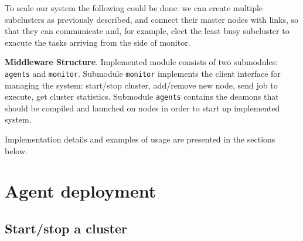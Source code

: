 \documentclass[12pt]{article}
\newcommand\MyFive[2]{%
  \foreach \x in {1,...,5}{
    \pgfmathparse{(\x-1)*72+floor(\x/6)*36 + 90 - 90*#2}
    \node[draw,circle,inner sep=5pt,text width=1cm, align=center] (#1-\x) at (\pgfmathresult:2.5cm){ \ifthenelse{1 = \x}{Master Node}{Node $\x$}};
  }
  \foreach \x [count=\xi from 1] in {1,...,5}{
    \foreach \y in {\x,...,5}{
    \path (#1-\xi) edge[-] (#1-\y);
  }
}
}
\begin{document}
To scale our system the following could be done: we can create multiple subclusters as previously described, and connect their master nodes with links, so that they can communicate and, for example, elect the least busy subcluster to exacute the tasks arriving from the side of monitor. 

	\begin{center}
	
	\end{center}


\textbf{Middleware Structure}. Implemented module consists of two submodules: \texttt{agents} and \texttt{monitor}. Submodule \texttt{monitor} implements the client interface for managing the system: start/stop cluster, add/remove new node, send job to execute, get cluster statistics. Submodule \texttt{agents} contains the deamons that should be compiled and launched on nodes in order to start up implemented system. 

Implementation details and examples of usage are presented in the sections below.

\section{Agent deployment}
\subsection{Start/stop a cluster}
\end{document}
